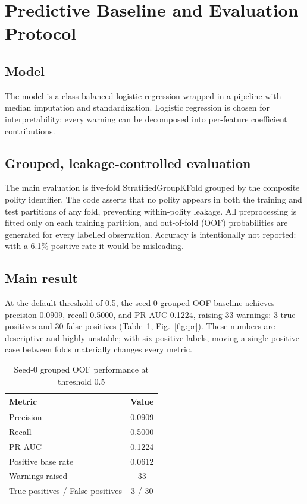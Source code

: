 \documentclass[conference]{IEEEtran}
\begin{document}
\section{Predictive Baseline and Evaluation Protocol}
\subsection{Model}
The model is a class-balanced logistic regression wrapped in a pipeline with
median imputation and standardization. Logistic regression is chosen for
interpretability: every warning can be decomposed into per-feature coefficient
contributions.

\subsection{Grouped, leakage-controlled evaluation}
The main evaluation is five-fold StratifiedGroupKFold grouped by the composite
polity identifier. The code asserts that no polity appears in both the training
and test partitions of any fold, preventing within-polity leakage. All
preprocessing is fitted only on each training partition, and out-of-fold (OOF)
probabilities are generated for every labelled observation. Accuracy is
intentionally not reported: with a 6.1\% positive rate it would be misleading.

\subsection{Main result}
At the default threshold of 0.5, the seed-0 grouped OOF baseline achieves
precision 0.0909, recall 0.5000, and PR-AUC 0.1224, raising 33 warnings: 3 true
positives and 30 false positives (Table~\ref{tab:main},
Fig.~\ref{fig:pr}). These numbers are
descriptive and highly unstable; with six positive labels, moving a single
positive case between folds materially changes every metric.

\begin{table}[t]
\centering
\caption{Seed-0 grouped OOF performance at threshold 0.5}
\label{tab:main}
\begin{tabular}{lc}
\hline\hline
Metric & Value \\
\hline
Precision & 0.0909 \\
Recall & 0.5000 \\
PR-AUC & 0.1224 \\
Positive base rate & 0.0612 \\
Warnings raised & 33 \\
True positives / False positives & 3 / 30 \\
\hline\hline
\end{tabular}
\end{table}
\end{document}
